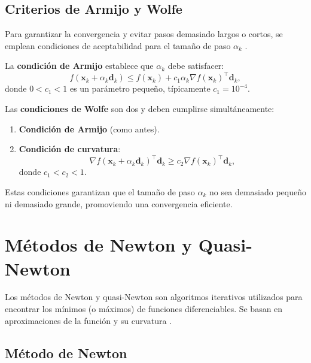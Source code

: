 \subsection{Criterios de Armijo y Wolfe}

Para garantizar la convergencia y evitar pasos demasiado largos o cortos, se emplean condiciones de aceptabilidad para el tamaño de paso $\alpha_k$ \cite{armijo1966minimization}.

\begin{definicion}
\label{def:armijo}
La \textbf{condición de Armijo} establece que $\alpha_k$ debe satisfacer:
\begin{equation}
f(\mathbf{x}_k + \alpha_k \mathbf{d}_k) \leq f(\mathbf{x}_k) + c_1 \alpha_k \nabla f(\mathbf{x}_k)^\top \mathbf{d}_k,
\end{equation}
donde $0 < c_1 < 1$ es un parámetro pequeño, típicamente $c_1 = 10^{-4}$.
\end{definicion}

\begin{definicion}
\label{def:wolfe}
Las \textbf{condiciones de Wolfe} son dos y deben cumplirse simultáneamente:
\begin{enumerate}
    \item \textbf{Condición de Armijo} (como antes).
    \item \textbf{Condición de curvatura}: 
    \begin{equation}
    \nabla f(\mathbf{x}_k + \alpha_k \mathbf{d}_k)^\top \mathbf{d}_k \geq c_2 \nabla f(\mathbf{x}_k)^\top \mathbf{d}_k,
    \end{equation}
    donde $c_1 < c_2 < 1$.
\end{enumerate}
\end{definicion}

Estas condiciones garantizan que el tamaño de paso $\alpha_k$ no sea demasiado pequeño ni demasiado grande, promoviendo una convergencia eficiente.

\section{Métodos de Newton y Quasi-Newton}

Los métodos de Newton y quasi-Newton son algoritmos iterativos utilizados para encontrar los mínimos (o máximos) de funciones diferenciables. Se basan en aproximaciones de la función y su curvatura \cite{nocedal2006numerical}.

\subsection{Método de Newton}

